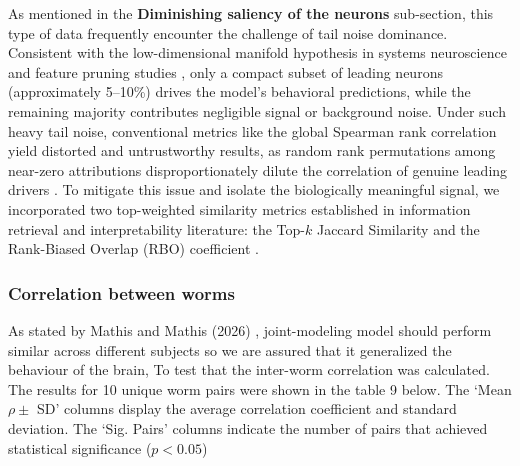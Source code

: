\documentclass{article}
\begin{document}
As mentioned in the \textbf{Diminishing saliency of the neurons} sub-section, this type of data
frequently encounter the challenge of tail noise dominance. Consistent 
with the low-dimensional manifold hypothesis in systems neuroscience \cite{cunningham2014dimensionality}
and feature pruning studies \cite{rahman2022interpreting}, only a compact subset of leading neurons
(approximately 5--10\%) drives the model's behavioral predictions,
while the remaining majority contributes negligible signal or background noise.
Under such heavy tail noise, conventional metrics like the global Spearman rank correlation
yield distorted and untrustworthy results, as random rank permutations among near-zero attributions
disproportionately dilute the correlation of genuine leading drivers \cite{webber2010similarity}.
To mitigate this issue and isolate the biologically meaningful signal, we incorporated two top-weighted
similarity metrics established in information retrieval and interpretability literature: the Top-$k$ Jaccard Similarity
and the Rank-Biased Overlap (RBO) coefficient \cite{webber2010similarity}.



\subsubsection{Correlation between worms}

As stated by Mathis and Mathis (2026) \cite{mathis2026joint}, joint-modeling model should perform similar across different subjects so we are assured that it generalized the behaviour of the brain, To test that the inter-worm correlation was calculated. The results for 10 unique worm pairs were shown in the table 9 below. The `Mean $\rho \pm$ SD' columns display the average correlation coefficient and standard deviation. The `Sig. Pairs' columns indicate the number of pairs that achieved statistical significance ($p < 0.05$)
\end{document}
